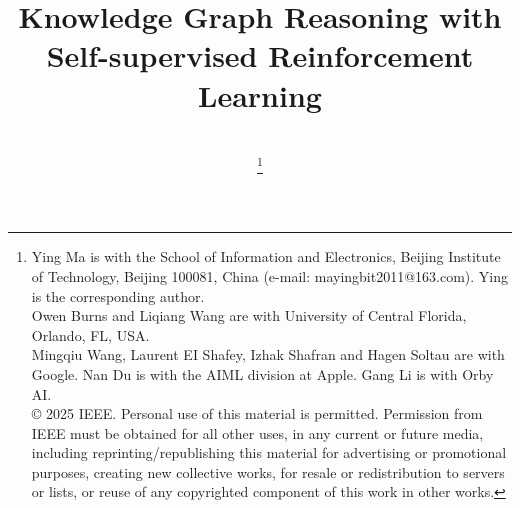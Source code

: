 \documentclass[lettersize,journal]{IEEEtran}
\begin{document}
\title{Knowledge Graph Reasoning with Self-supervised Reinforcement Learning}




\author{
    \\ 

   \thanks{Ying Ma is with the School of Information and Electronics, Beijing Institute of Technology, Beijing 100081, China (e-mail: mayingbit2011@163.com). Ying is the corresponding author.  \\
\hspace*{1em}Owen Burns and Liqiang Wang are with University
of Central Florida, Orlando, FL, USA. \\
\hspace*{1em} Mingqiu Wang, Laurent EI Shafey, Izhak Shafran and Hagen Soltau are with Google.
Nan Du is with the AIML division at Apple. Gang Li is with Orby AI. \\
© 2025 IEEE.  Personal use of this material is permitted.  Permission from IEEE must be obtained for all other uses, in any current or future media, including reprinting/republishing this material for advertising or promotional purposes, creating new collective works, for resale or redistribution to servers or lists, or reuse of any copyrighted component of this work in other works.
  }
}

\maketitle
\end{document}
